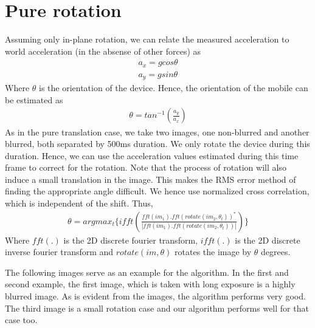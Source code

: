 \documentclass[BTech]{iitmdiss}
\begin{document}
\section{Pure rotation}
\label{image_registration:pure_rotation}
Assuming only in-plane rotation, we can relate the measured acceleration
to world acceleration (in the absense of other forces) as
\begin{align*}
a_x=gcos\theta\\
a_y=gsin\theta
\end{align*}
Where $\theta$ is the orientation of the device. Hence, the orientation
of the mobile can be estimated as
\begin{align*}
\theta=tan^{-1}(\frac{a_y}{a_x})
\end{align*}
As in the pure translation case, we take two images, one non-blurred and
another blurred, both separated by 500ms duration. We only rotate the 
device during this duration. Hence, we can use the acceleration values
estimated during this time frame to correct for the rotation. Note that
the process of rotation will also induce a small translation in the 
image. This makes the RMS error method of finding the appropriate
angle difficult. We hence use normalized cross correlation, which is 
independent of the shift. Thus,
\begin{align*}
\theta=argmax_t\big\{ifft(\frac{fft(im_1).fft(rotate(im_2,\theta_t))^*}
{|fft(im_1).fft(rotate(im_2,\theta_t))|})\}
\end{align*}
Where $fft(.)$ is the 2D discrete fourier transform, $ifft(.)$ is the 2D 
discrete inverse fourier transform and $rotate(im, \theta)$ rotates the image
by $\theta$ degrees.

The following images serve as an example for the algorithm. In the first and
second example, the first image, which is taken with long exposure is a highly
blurred image. As is evident from the images, the algorithm performs very good. 
The third image is a small rotation case and our algorithm performs well for
that case too.
\end{document}
